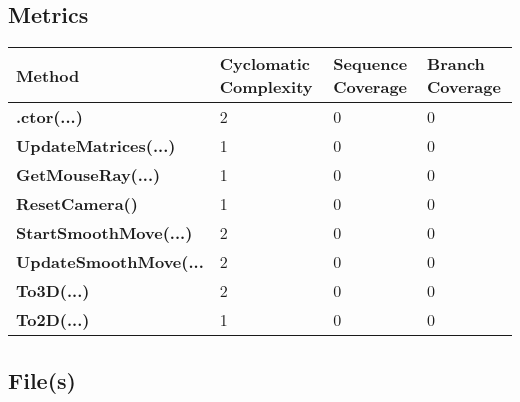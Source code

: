 \documentclass[a4paper,10pt]{article}
\begin{document}
\subsection{Metrics}
\begin{longtable}[l]{|l|l|l|l|}
\hline
\textbf{Method} & \textbf{Cyclomatic Complexity} & \textbf{Sequence Coverage} & \textbf{Branch Coverage}\\
\hline
\textbf{.ctor(...)} & 2 & 0 & 0\\
\hline
\textbf{UpdateMatrices(...)} & 1 & 0 & 0\\
\hline
\textbf{GetMouseRay(...)} & 1 & 0 & 0\\
\hline
\textbf{ResetCamera()} & 1 & 0 & 0\\
\hline
\textbf{StartSmoothMove(...)} & 2 & 0 & 0\\
\hline
\textbf{UpdateSmoothMove(...} & 2 & 0 & 0\\
\hline
\textbf{To3D(...)} & 2 & 0 & 0\\
\hline
\textbf{To2D(...)} & 1 & 0 & 0\\
\hline
\end{longtable}
\subsection{File(s)}
\end{document}
